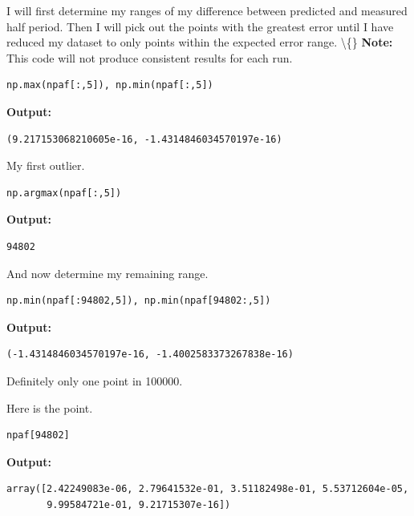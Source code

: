 \documentclass{article}
\begin{document}
I will first determine my ranges of my difference between predicted and measured half period. Then I will pick out the points with the greatest error until I have reduced my dataset to only points within the expected error range. \textbackslash\{\}
\textbf{Note:} This code will not produce consistent results for each run. 

\begin{lstlisting}
np.max(npaf[:,5]), np.min(npaf[:,5])\end{lstlisting}

\textbf{Output:}\begin{verbatim}
(9.217153068210605e-16, -1.4314846034570197e-16)
\end{verbatim}

My first outlier.

\begin{lstlisting}
np.argmax(npaf[:,5])\end{lstlisting}

\textbf{Output:}\begin{verbatim}
94802
\end{verbatim}

And now determine my remaining range.

\begin{lstlisting}
np.min(npaf[:94802,5]), np.min(npaf[94802:,5])\end{lstlisting}

\textbf{Output:}\begin{verbatim}
(-1.4314846034570197e-16, -1.4002583373267838e-16)
\end{verbatim}

Definitely only one point in 100000.

Here is the point.

\begin{lstlisting}
npaf[94802]\end{lstlisting}

\textbf{Output:}\begin{verbatim}
array([2.42249083e-06, 2.79641532e-01, 3.51182498e-01, 5.53712604e-05,
       9.99584721e-01, 9.21715307e-16])
\end{verbatim}
\end{document}
